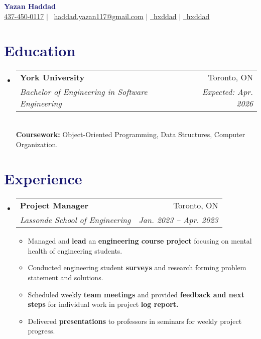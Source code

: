 \documentclass[11pt]{extreport}
\makeatletter
\newcommand{\resumeItem}[1]{
  \item\small{
    {#1 \vspace{-2pt}}
  }
}
\newcommand{\resumeSubheading}[4]{
  \vspace{-2pt}\item
    \begin{tabular*}{0.97\textwidth}[t]{l@{\extracolsep{\fill}}r}
      \textbf{#1} & #2 \\
      \textit{\small#3} & \textit{\small #4} \\  
    \end{tabular*}\vspace{-7pt}
}
\newcommand{\resumeSubHeadingListStart}{\begin{itemize}[leftmargin=0.15in, label={}]}
\newcommand{\resumeSubHeadingListEnd}{\end{itemize}}
\newcommand{\resumeItemListStart}{\begin{itemize}}
\newcommand{\resumeItemListEnd}{\end{itemize}\vspace{-5pt}}
\makeatother
\begin{document}
\begin{center}
    \textbf{\huge \textcolor{MidnightBlue}{Yazan Haddad}} \\ \vspace{8pt}
    \small \raisebox{-0.25ex}{\faPhone} \underline{437-450-0117} $|$ {{\faEnvelope \, \underline{haddad.yazan117@gmail.com}}} $|$ 
\href{https://www.linkedin.com/in/hxddad}{\faLinkedin \, \underline{hxddad}} $|$ \href{https://hxddad.dev}{\faGithub \, \underline{hxddad}}
\end{center}

\section{\textcolor{MidnightBlue}{Education}}
  \resumeSubHeadingListStart
    \resumeSubheading
      {York University}{Toronto, ON}
      {Bachelor of Engineering in Software Engineering}{Expected: Apr. 2026} 
      \vspace{10pt}\\
      \textbf{Coursework:} Object-Oriented Programming, Data Structures, Computer Organization.
  \resumeSubHeadingListEnd

\section{\textcolor{MidnightBlue}{Experience}}
    \resumeSubHeadingListStart
        \resumeSubheading
            {Project Manager}{Toronto, ON}
            {Lassonde School of Engineering}{Jan. 2023 -- Apr. 2023}
            \resumeItemListStart
                \resumeItem{Managed and \textbf{lead} an \textbf{engineering course project} focusing on mental health of engineering students.}
                \resumeItem{Conducted engineering student \textbf{surveys} and research forming problem statement and solutions.}
                \resumeItem{Scheduled weekly \textbf{team meetings} and provided \textbf{feedback and next steps} for individual work in project \textbf{log report.}}
                \resumeItem{Delivered \textbf{presentations} to professors in seminars for weekly project progress.}
            \resumeItemListEnd
    \resumeSubHeadingListEnd

\end{document}
